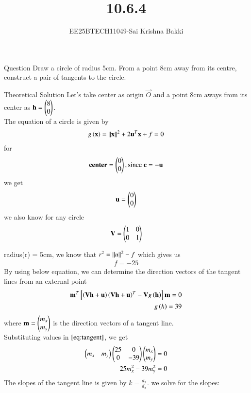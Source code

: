 \documentclass{beamer}
\title %
{10.6.4}
\author 
{EE25BTECH11049-Sai Krishna Bakki}
\begin{document}
\frame{\titlepage}
\begin{frame}{Question}
Draw a circle of radius 5cm. From a point 8cm away from its centre, construct a pair of tangents to the circle.
\end{frame}
\begin{frame}{Theoretical Solution}
    Let's take center as origin $\vec{O}$ and a point 8cm aways from its center as $\mathbf{h}=\begin{pmatrix}8\\0\end{pmatrix}$.\\
The equation of a circle is given by 
\begin{align}
    g\left(\mathbf{x}\right)=\left\lVert\mathbf{x}\right\rVert^2+2\mathbf{u}^T\mathbf{x}+f=0
\end{align}
for
\begin{align}
\textbf{center}=\begin{pmatrix}0\\0\end{pmatrix}, \text{since } \mathbf{c}=\mathbf{-u} 
\end{align}
we get
\begin{align}
\mathbf{u}=\begin{pmatrix}0\\0\end{pmatrix}
\end{align}
we also know for any circle
\begin{align}
    \mathbf{V}=\begin{pmatrix}1&0\\0&1\end{pmatrix}
\end{align}
\end{frame}
\begin{frame}
radius(r) = 5cm, we know that  $r^2=\left\lVert u\right\rVert^2-f$ which gives us 
\begin{align}
    f=-25
\end{align}
By using below equation, we can determine the direction vectors of the tangent lines from an external point
\begin{align} \mathbf{m}^T{}\left[\left(\mathbf{V}\mathbf{h}+\mathbf{u}\right)\left(\mathbf{V}\mathbf{h}+\mathbf{u}\right)^T-\mathbf{V}g\left(\mathbf{h}\right)\right]\mathbf{m}=0\\
g\left(h\right)=39
\label{eq:tangent}
\end{align}
where $\mathbf{m}=\begin{pmatrix}m_x\\m_y\end{pmatrix}$ is the direction vectors of a tangent line.\\
Substituting values in $\eqref{eq:tangent}$, we get
\begin{align}
\begin{pmatrix}m_x&m_y\end{pmatrix}\begin{pmatrix}25&0\\0&-39\end{pmatrix}\begin{pmatrix}m_x\\m_y\end{pmatrix}=0\\
25m_x^2-39m_y^2=0\\
\end{align}
The slopes of the tangent line is given by $k=\frac{d_x}{d_x}$. we solve for the slopes:
\end{frame}
\end{document}
